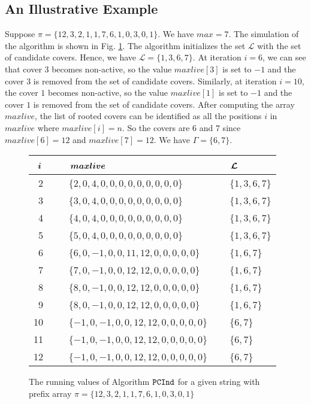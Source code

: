 \documentclass[runningheads,a4paper]{llncs}
\def\s#1{\mbox{\boldmath $#1$}}
\def\PCInd{\tt{PCInd}}
\begin{document}
\subsection{An Illustrative Example}
Suppose $\pi= \{12,3,2,1,1,7,6,1,0,3,0,1\}$.
We have $max =7$. The simulation of the algorithm is shown in Fig.
\ref{PCInd-ex}. The algorithm initializes the set $\mathcal L$ with the set of 
candidate covers. Hence, we have $\mathcal L= \{1,3,6,7\}$. At iteration 
$i=6$, we can see that cover $3$ becomes non-active, so the value $maxlive[3]$
is set to $-1$ and the cover $3$ is removed from the set of candidate covers.
Similarly, at iteration $i=10$, the cover $1$ becomes
non-active, so the value $maxlive[1]$ is set to $-1$ and the cover $1$ is
removed from the set of candidate covers. After computing the array $maxlive$,
the list of rooted covers can be identified as all the positions $i$ in
$maxlive$ where $maxlive[i] = n$. So the covers are $6$ and $7$ since
$maxlive[6]= 12$ and $maxlive[7]=12$. We have $\Gamma = \{6, 7\}$.

\begin{figure}[htbp]
\centering 
\begin{tabular}{r|l|l}
	$\s{i}$ ~ & ~ $\s{maxlive}$ ~ & ~ $\s{\mathcal L}$ \\
	\hline
	2 ~ & ~ $\{2,0,4,0,0,0,0,0,0,0,0,0\}$ ~ & ~  $\{1,3,6,7\}$ \\
	3 ~ & ~ $\{3,0,4,0,0,0,0,0,0,0,0,0\}$~ & ~ $\{1,3,6,7\}$ \\
	4 ~ & ~ $\{4,0,4,0,0,0,0,0,0,0,0,0\}$~ & ~ $\{1,3,6,7\}$ \\
	5 ~ & ~ $\{5,0,4,0,0,0,0,0,0,0,0,0\}$~ & ~ $\{1,3,6,7\}$ \\
	6 ~ & ~ $\{6,0,-1,0,0,11,12,0,0,0,0,0\}$~ & ~ $\{1,6,7\}$ \\
	7 ~ & ~ $\{7,0,-1,0,0,12,12,0,0,0,0,0\}$~ & ~ $\{1,6,7\}$ \\
	8 ~ & ~ $\{8,0,-1,0,0,12,12,0,0,0,0,0\}$~ & ~ $\{1,6,7\}$ \\
	9 ~ & ~ $\{8,0,-1,0,0,12,12,0,0,0,0,0\}$~ & ~ $\{1,6,7\}$ \\
	10 ~ & ~ $\{-1,0,-1,0,0,12,12,0,0,0,0,0\}$~ & ~ $\{6,7\}$ \\
	11 ~ & ~ $\{-1,0,-1,0,0,12,12,0,0,0,0,0\}$~ & ~ $\{6,7\}$ \\
	12 ~ & ~ $\{-1,0,-1,0,0,12,12,0,0,0,0,0\}$~ & ~ $\{6,7\}$
\end{tabular}
\caption{The running values of Algorithm $\PCInd$ for a given string
with prefix array $\pi= \{12,3,2,1,1,7,6,1,0,3,0,1\}$}
\label{PCInd-ex} 
\end{figure}
\end{document}
